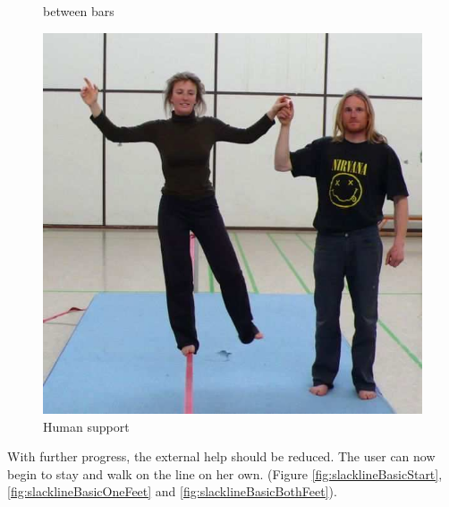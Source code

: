 \begin{figure}[htb]
\begin{minipage}[t]{0.38\linewidth}
		\caption{between bars \cite{Kroiss2007-ab}}
		\label{fig:slacklineHelpBar}
	\end{minipage}
	\hfill
	\begin{minipage}[t]{0.3\linewidth}
		\centering
		\includegraphics[width=1\linewidth]{Pictures/slacklineHelpHuman}
		\caption{Human support \cite{Kroiss2007-ab}}
		\label{fig:slacklineHelpHuman}
	\end{minipage}
\end{figure}

With further progress, the external help should be reduced. The user can now begin to stay and walk on the line on her own. (Figure \ref{fig:slacklineBasicStart}, \ref{fig:slacklineBasicOneFeet} and \ref{fig:slacklineBasicBothFeet}). 



